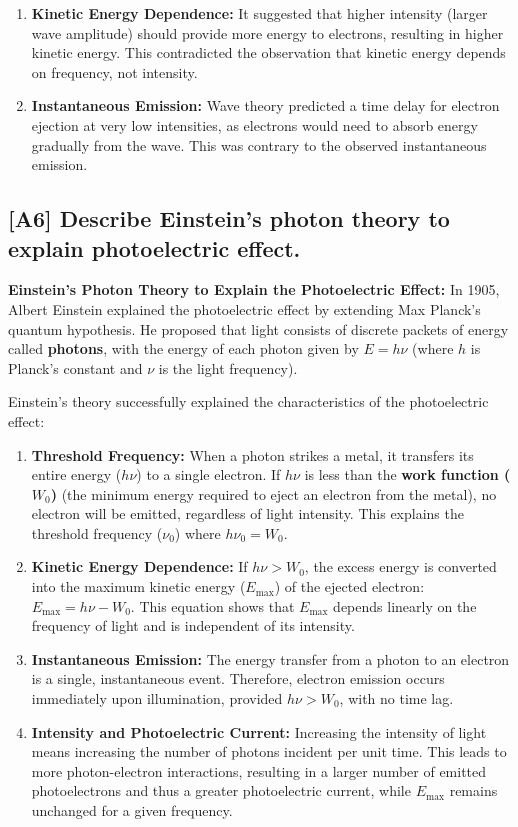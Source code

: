 \documentclass[12pt]{article}
\begin{document}
\begin{itemize}
\begin{enumerate}[label=\roman*.]
        \item \textbf{Kinetic Energy Dependence:} It suggested that higher intensity (larger wave amplitude) should provide more energy to electrons, resulting in higher kinetic energy. This contradicted the observation that kinetic energy depends on frequency, not intensity.
        \item \textbf{Instantaneous Emission:} Wave theory predicted a time delay for electron ejection at very low intensities, as electrons would need to absorb energy gradually from the wave. This was contrary to the observed instantaneous emission.
    \end{enumerate}
\end{itemize}

\subsection{[A6] Describe Einstein's photon theory to explain photoelectric effect.}

\textbf{Einstein's Photon Theory to Explain the Photoelectric Effect:}
In 1905, Albert Einstein explained the photoelectric effect by extending Max Planck's quantum hypothesis. He proposed that light consists of discrete packets of energy called \textbf{photons}, with the energy of each photon given by $E=h\nu$ (where $h$ is Planck's constant and $\nu$ is the light frequency).

Einstein's theory successfully explained the characteristics of the photoelectric effect:
\begin{enumerate}
    \item \textbf{Threshold Frequency:} When a photon strikes a metal, it transfers its entire energy ($h\nu$) to a single electron. If $h\nu$ is less than the \textbf{work function ($W_0$)} (the minimum energy required to eject an electron from the metal), no electron will be emitted, regardless of light intensity. This explains the threshold frequency ($\nu_0$) where $h\nu_0=W_0$.
    \item \textbf{Kinetic Energy Dependence:} If $h\nu > W_0$, the excess energy is converted into the maximum kinetic energy ($E_{\max}$) of the ejected electron: $E_{\max}=h\nu - W_0$. This equation shows that $E_{\max}$ depends linearly on the frequency of light and is independent of its intensity.
    \item \textbf{Instantaneous Emission:} The energy transfer from a photon to an electron is a single, instantaneous event. Therefore, electron emission occurs immediately upon illumination, provided $h\nu > W_0$, with no time lag.
    \item \textbf{Intensity and Photoelectric Current:} Increasing the intensity of light means increasing the number of photons incident per unit time. This leads to more photon-electron interactions, resulting in a larger number of emitted photoelectrons and thus a greater photoelectric current, while $E_{\max}$ remains unchanged for a given frequency.
\end{enumerate}
\end{document}
